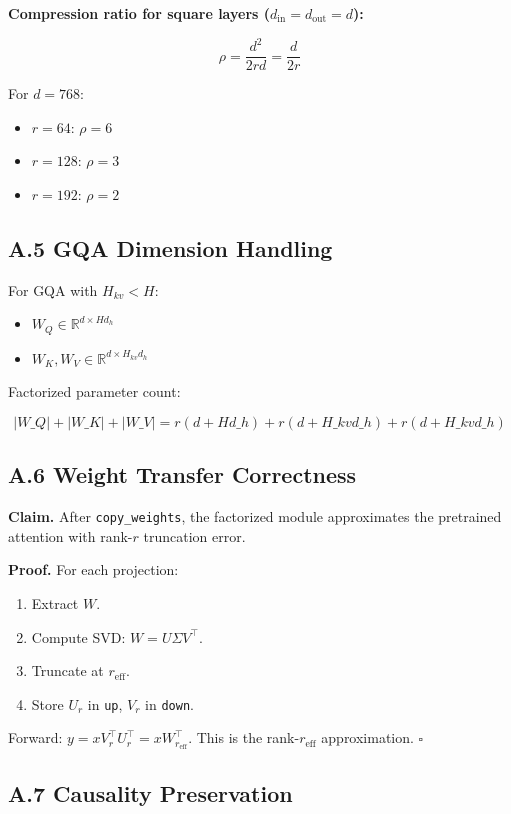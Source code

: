 \textbf{Compression ratio for square layers ($d_\text{in} = d_\text{out} = d$):}

\[
\rho = \frac{d^2}{2rd} = \frac{d}{2r}
\tag{A.3}
\]

For $d = 768$:
\begin{itemize}
\item $r = 64$: $\rho = 6$
\item $r = 128$: $\rho = 3$
\item $r = 192$: $\rho = 2$

\end{itemize}
\subsection{A.5 GQA Dimension Handling}

For GQA with $H_{kv} < H$:

\begin{itemize}
\item $W_Q \in \mathbb{R}^{d \times H d_h}$
\item $W_K, W_V \in \mathbb{R}^{d \times H_{kv} d_h}$

\end{itemize}
Factorized parameter count:

\[
|W\_Q| + |W\_K| + |W\_V| = r(d + H d\_h) + r(d + H\_{kv} d\_h) + r(d + H\_{kv} d\_h)
\tag{A.4}
\]

\subsection{A.6 Weight Transfer Correctness}

\textbf{Claim.} After \texttt{copy\_weights}, the factorized module approximates the 
pretrained attention with rank-$r$ truncation error.

\textbf{Proof.} For each projection:
\begin{enumerate}
\item Extract $W$.
\item Compute SVD: $W = U \Sigma V^\top$.
\item Truncate at $r_\text{eff}$.
\item Store $U_r$ in \texttt{up}, $V_r$ in \texttt{down}.

\end{enumerate}
Forward: $y = x V_r^\top U_r^\top = x W_{r_\text{eff}}^\top$. This is the 
rank-$r_\text{eff}$ approximation. $\square$

\subsection{A.7 Causality Preservation}

